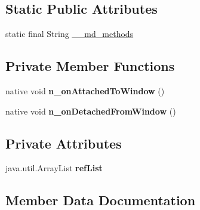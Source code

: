 \subsection*{Static Public Attributes}
\begin{DoxyCompactItemize}
\item 
static final String \hyperlink{classmd5b60ffeb829f638581ab2bb9b1a7f4f3f_1_1TabbedRenderer_a38151846bc49cd1f6a91896a729a40ec}{\+\_\+\+\_\+md\+\_\+methods}
\end{DoxyCompactItemize}
\subsection*{Private Member Functions}
\begin{DoxyCompactItemize}
\item 
\mbox{\label{classmd5b60ffeb829f638581ab2bb9b1a7f4f3f_1_1TabbedRenderer_ac552558d45baca5c9e063a2a285e54e4}} 
native void {\bfseries n\+\_\+on\+Attached\+To\+Window} ()
\item 
\mbox{\label{classmd5b60ffeb829f638581ab2bb9b1a7f4f3f_1_1TabbedRenderer_a8a43df8840c31f22c2e855fce9416b1b}} 
native void {\bfseries n\+\_\+on\+Detached\+From\+Window} ()
\end{DoxyCompactItemize}
\subsection*{Private Attributes}
\begin{DoxyCompactItemize}
\item 
\mbox{\label{classmd5b60ffeb829f638581ab2bb9b1a7f4f3f_1_1TabbedRenderer_a475c98fea70c5eb38a89991a3bb04f77}} 
java.\+util.\+Array\+List {\bfseries ref\+List}
\end{DoxyCompactItemize}


\subsection{Member Data Documentation}
\mbox{\label{classmd5b60ffeb829f638581ab2bb9b1a7f4f3f_1_1TabbedRenderer_a38151846bc49cd1f6a91896a729a40ec}} 
